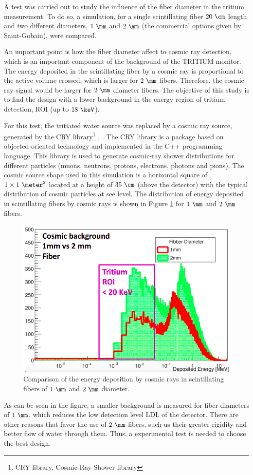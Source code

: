 A test was carried out to study the influence of the fiber diameter in the tritium measurement. To do so, a simulation, for a single scintillating fiber $20~\cm$ length and two different diameters, $1~\mm$ and $2~\mm$ (the commercial options given by Saint-Gobain), were compared.

An important point is how the fiber diameter affect to cosmic ray detection, which is an important component of the background of the TRITIUM monitor. The energy deposited in the scintillating fiber by a cosmic ray is proportional to the active volume crossed, which is larger for $2~\mm$ fibers. Therefore, the cosmic ray signal would be larger for $2~\mm$ diameter fibers. The objective of this study is to find the design with a lower background in the energy region of tritium detection, ROI (up to $18~\keV$). 

For this test, the tritiated water source was replaced by a cosmic ray source, generated by the CRY library\footnote{CRY library, Cosmic-Ray Shower library} \cite{CRYwebsite}, \cite{CRYpaper}. The CRY library is a package based on objected-oriented technology and implemented in the C++ programming language. This library is used to generate cosmic-ray shower distributions for different particles (muons, neutrons, protons, electrons, photons and pions). The cosmic source shape used in this simulation is a horizontal square of $1 \times 1~\meter ^2$ located at a height of $35~\cm$ (above the detector) with the typical distribution of cosmic particles at see level. The distribution of energy deposited in scintillating fibers by cosmic rays is shown in Figure \ref{fig:DiameterComparison} for $1~\mm$ and $2~\mm$ fibers.

\begin{figure}[hbtp]
\centering
\includegraphics[scale=0.4]{Figures/8SimulationsResults/81TRITIUMDesign/814Diameter/ComparisonDiameter.png}
\caption{Comparison of the energy deposition by cosmic rays in scintillating fibers of $1~\mm$ and $2~\mm$ diameter.\label{fig:DiameterComparison}}
\end{figure}
As can be seen in the figure, a smaller background is measured for fiber diameters of $1~\mm$, which reduces the low detection level LDL of the detector. There are other reasons that favor the use of $2~\mm$ fibers, such us their greater rigidity and better flow of water through them. Thus, a experimental test is needed to choose the best design.